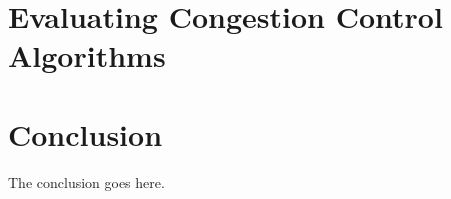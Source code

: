 \documentclass[journal,transmag]{IEEEtran}
\begin{document}





\section{Evaluating Congestion Control Algorithms}


\section{Conclusion}
The conclusion goes here.






\ifCLASSOPTIONcaptionsoff
  \newpage
\fi








\end{document}
